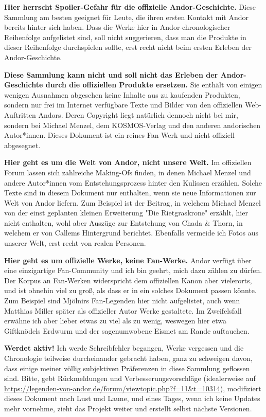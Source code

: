 \documentclass[10pt, a4paper, oneside]{book}
\newcommand{\fillbreak}{\vspace*{\fill}\columnbreak}
\begin{document}
\begin{multicols}{2}
\textbf{Hier herrscht Spoiler-Gefahr für die offizielle Andor-Geschichte.} Diese Sammlung am besten geeignet für Leute, die ihren ersten Kontakt mit Andor bereits hinter sich haben. Dass die Werke hier in Andor-chronologischer Reihenfolge aufgelistet sind, soll nicht suggerieren, dass man die Produkte in dieser Reihenfolge durchspielen sollte, erst recht nicht beim ersten Erleben der Andor-Geschichte.\bigskip

\fillbreak

\textbf{Diese Sammlung kann nicht und soll nicht das Erleben der Andor-Geschichte durch die offiziellen Produkte ersetzen.} Sie enthält von einigen wenigen Ausnahmen abgesehen keine Inhalte aus zu kaufenden Produkten, sondern nur frei im Internet verfügbare Texte und Bilder von den offiziellen Web-Auftritten Andors. Deren Copyright liegt natürlich dennoch nicht bei mir, sondern bei Michael Menzel, dem KOSMOS-Verlag und den anderen andorischen Autor*innen. Dieses Dokument ist ein reines Fan-Werk und nicht offiziell abgesegnet.\bigskip

\textbf{Hier geht es um die Welt von Andor, nicht unsere Welt.} Im offiziellen Forum lassen sich zahlreiche Making-Ofs finden, in denen Michael Menzel und andere Autor*innen vom Entstehungsprozess hinter den Kulissen erzählen. Solche Texte sind in diesem Dokument nur enthalten, wenn sie neue Informationen zur Welt von Andor liefern. Zum Beispiel ist der Beitrag, in welchem Michael Menzel von der einst geplanten kleinen Erweiterung "Die Rietgraskrone" erzählt, hier nicht enthalten, wohl aber Auszüge zur Entstehung von Chada \& Thorn, in welchem er von Callems Hintergrund berichtet. Ebenfalls vermeide ich Fotos aus unserer Welt, erst recht von realen Personen.\bigskip

\textbf{Hier geht es um offizielle Werke, keine Fan-Werke.} Andor verfügt über eine einzigartige Fan-Community und ich bin geehrt, mich dazu zählen zu dürfen. Der Korpus an Fan-Werken widerspricht dem offiziellen Kanon aber vielerorts, und ist ohnehin viel zu groß, als dass er in ein solches Dokument passen könnte. Zum Beispiel sind Mjölnirs Fan-Legenden hier nicht aufgelistet, auch wenn Matthias Miller später als offizieller Autor Werke gestaltete. Im Zweifelsfall erwähne ich aber lieber etwas zu viel als zu wenig, weswegen hier etwa Giftknödels Erdwurm und der sagenumwobene Eismet am Rande auftauchen.\bigskip

\textbf{Werdet aktiv!} Ich werde Schreibfehler begangen, Werke vergessen und die Chronologie teilweise durcheinander gebracht haben, ganz zu schweigen davon, dass einige meiner völlig subjektiven Präferenzen in diese Sammlung geflossen sind. Bitte, gebt Rückmeldungen und Verbesserungsvorschläge (idealerweise auf \url{https://legenden-von-andor.de/forum/viewtopic.php?f=11&t=10314}), modifiziert dieses Dokument nach Lust und Laune, und eines Tages, wenn ich keine Updates mehr vornehme, zieht das Projekt weiter und erstellt selbst nächste Versionen.\bigskip


\end{multicols}
\end{document}
